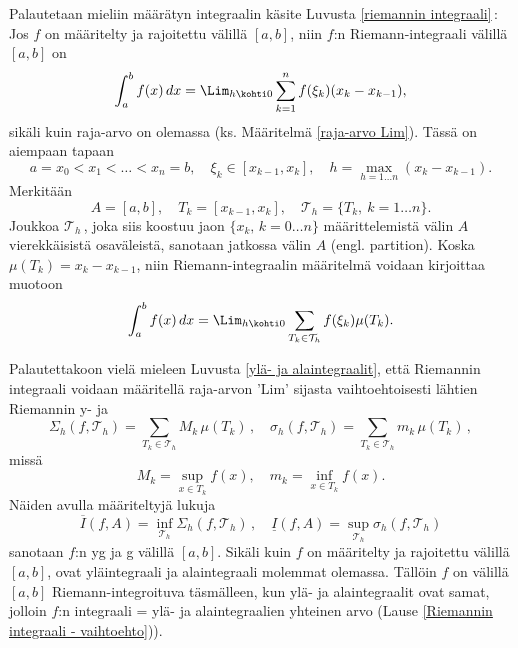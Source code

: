 Palautetaan mieliin määrätyn integraalin käsite Luvusta \ref{riemannin integraali}\,: Jos $f$ on
määritelty ja rajoitettu välillä $[a,b]$, niin $f$:n Riemann-integraali välillä $[a,b]$ on
\[
\int_a^b f(x)\, dx=\Lim_{h \kohti 0} \sum_{k=1}^n f(\xi_k)(x_k-x_{k-1}),
\]
sikäli kuin raja-arvo on olemassa (ks. Määritelmä \ref{raja-arvo Lim}). Tässä on aiempaan tapaan
\[
a=x_0<x_1<\ldots <x_n=b, \quad \xi_k\in [x_{k-1},x_k], \quad h=\max_{h=1\ldots n} (x_k-x_{k-1}).
\]
Merkitään
\[
A=[a,b],\quad T_k=[x_{k-1},x_k], \quad \mathcal{T}_h=\{T_k, \ k=1\ldots n\}.
\]
Joukkoa $\mathcal{T}_h\,$, joka siis koostuu jaon $\{x_k,\,k=0 \ldots n\}$ määrittelemistä välin
$A$ vierekkäisistä osaväleistä, sanotaan jatkossa välin $A$  (engl. partition).
Koska $\mu(T_k)=x_k-x_{k-1}$, niin Riemann-integraalin määritelmä voidaan kirjoittaa muotoon
\[
\int_a^b f(x)\, dx=\Lim_{h \kohti 0} \sum_{T_k\in\mathcal{T}_h} f(\xi_k)\mu(T_k).
\]

Palautettakoon vielä mieleen Luvusta \ref{ylä- ja alaintegraalit}, että Riemannin integraali
voidaan määritellä raja-arvon 'Lim' sijasta vaihtoehtoisesti lähtien Riemannin y- ja 
\[
\Sigma_h (f,\mathcal{T}_h) = \sum_{T_k\in\mathcal{T}_h} M_k\,\mu(T_k)\,, \quad
\sigma_h (f,\mathcal{T}_h) = \sum_{T_k\in\mathcal{T}_h} m_k\,\mu(T_k)\,,
\]
missä
\[
M_k=\sup_{x\in T_k} f(x),\quad m_k=\inf_{x\in T_k} f(x).
\]
Näiden avulla määriteltyjä lukuja
\[
\overline{I}(f,A)=\inf_{\mathcal{T}_h} \Sigma_h(f,\mathcal{T}_h)\,,\quad 
\underline{I}(f,A)=\sup_{\mathcal{T}_h} \sigma_h(f,\mathcal{T}_h)
\]
sanotaan $f$:n yg ja g välillä $[a,b]$.
Sikäli kuin $f$ on määritelty ja rajoitettu välillä $[a,b]$, ovat yläintegraali ja alaintegraali
molemmat olemassa. Tällöin $f$ on välillä $[a,b]$ Riemann-integroituva täsmälleen, kun ylä- ja
alaintegraalit ovat samat, jolloin $f$:n integraali = ylä- ja alaintegraalien yhteinen arvo 
(Lause \ref{Riemannin integraali - vaihtoehto})). 

